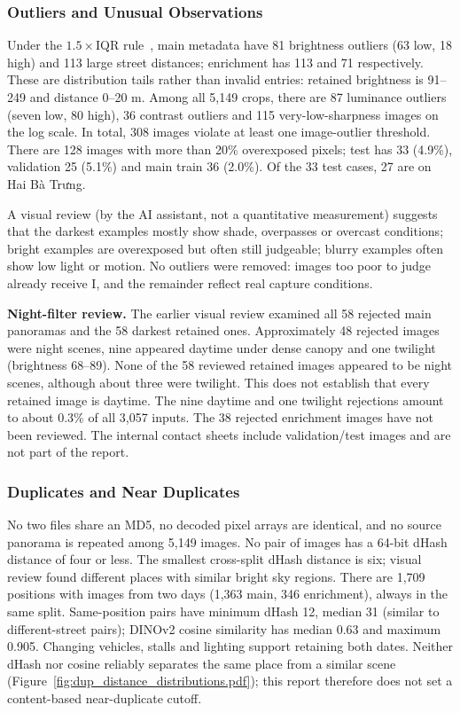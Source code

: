 \subsubsection*{Outliers and Unusual Observations}
Under the $1.5\times$IQR rule~\cite{tukey1977eda}, main metadata have 81 brightness outliers (63 low, 18 high) and 113 large street distances; enrichment has 113 and 71 respectively. These are distribution tails rather than invalid entries: retained brightness is 91--249 and distance 0--20 m. Among all 5,149 crops, there are 87 luminance outliers (seven low, 80 high), 36 contrast outliers and 115 very-low-sharpness images on the log scale. In total, 308 images violate at least one image-outlier threshold. There are 128 images with more than 20\% overexposed pixels; test has 33 (4.9\%), validation 25 (5.1\%) and main train 36 (2.0\%). Of the 33 test cases, 27 are on Hai Bà Trưng.

A visual review (by the AI assistant, not a quantitative measurement) suggests that the darkest examples mostly show shade, overpasses or overcast conditions; bright examples are overexposed but often still judgeable; blurry examples often show low light or motion. No outliers were removed: images too poor to judge already receive I, and the remainder reflect real capture conditions.

\textbf{Night-filter review.} The earlier visual review examined all 58 rejected main panoramas and the 58 darkest retained ones. Approximately 48 rejected images were night scenes, nine appeared daytime under dense canopy and one twilight (brightness 68--89). None of the 58 reviewed retained images appeared to be night scenes, although about three were twilight. This does not establish that every retained image is daytime. The nine daytime and one twilight rejections amount to about 0.3\% of all 3,057 inputs. The 38 rejected enrichment images have not been reviewed. The internal contact sheets include validation/test images and are not part of the report.

\subsubsection*{Duplicates and Near Duplicates}
No two files share an MD5, no decoded pixel arrays are identical, and no source panorama is repeated among 5,149 images. No pair of images has a 64-bit dHash distance of four or less. The smallest cross-split dHash distance is six; visual review found different places with similar bright sky regions. There are 1,709 positions with images from two days (1,363 main, 346 enrichment), always in the same split. Same-position pairs have minimum dHash 12, median 31 (similar to different-street pairs); DINOv2 cosine similarity has median 0.63 and maximum 0.905. Changing vehicles, stalls and lighting support retaining both dates. Neither dHash nor cosine reliably separates the same place from a similar scene (Figure~\ref{fig:dup_distance_distributions.pdf}); this report therefore does not set a content-based near-duplicate cutoff.

